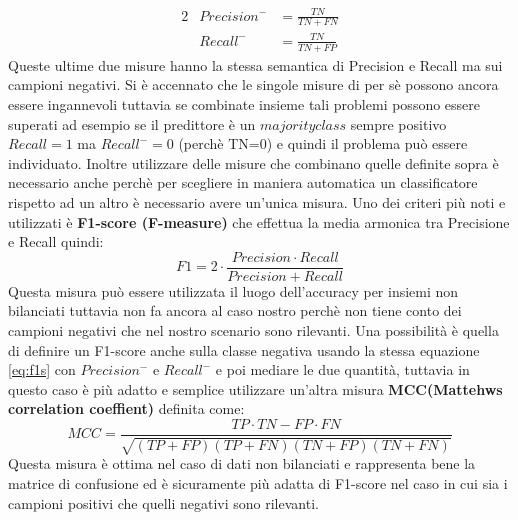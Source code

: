 \begin{alignat*}{2}
& Precision^{-} &= \frac{TN}{TN+FN}\\
& Recall^{-} &=  \frac{TN}{TN+FP}
\end{alignat*} 
Queste ultime due misure hanno la stessa semantica di Precision e Recall ma sui campioni negativi. Si è accennato che le singole misure di per sè possono ancora essere ingannevoli tuttavia se combinate insieme tali problemi possono essere superati ad esempio se il predittore è un $majority class$ sempre positivo $Recall=1$ ma  $Recall^{-}=0$ (perchè TN=0) e quindi il problema può essere individuato. Inoltre utilizzare delle misure che combinano quelle definite sopra è necessario anche perchè per scegliere in maniera automatica un classificatore rispetto ad un altro è necessario avere un'unica misura. Uno dei criteri più noti e utilizzati è \textbf{F1-score (F-measure)} che effettua la media armonica tra Precisione e Recall quindi:
\begin{equation*}
\label{eq:f1s}
F1 = 2 \cdot \frac{Precision \cdot Recall}{Precision + Recall}
\end{equation*}
Questa misura può essere utilizzata il luogo dell'accuracy per insiemi non bilanciati tuttavia non fa ancora al caso nostro perchè non tiene conto dei campioni negativi che nel nostro scenario sono rilevanti. Una possibilità è quella di definire un F1-score anche sulla classe negativa usando la stessa equazione \eqref{eq:f1s} con $Precision^{-}\text{ e } Recall^{-}$ e poi mediare le due quantità, tuttavia in questo caso è più adatto e semplice utilizzare un'altra misura \textbf{MCC(Mattehws correlation coeffient)} definita come:
\begin{equation*}
MCC = \frac{TP \cdot TN−FP \cdot FN}{\sqrt{(TP+FP)(TP+FN)(TN+FP)(TN+FN)}}
 \end{equation*}
 Questa misura è ottima nel caso di dati non bilanciati e rappresenta bene la matrice di confusione ed è sicuramente più adatta di F1-score nel caso in cui sia i campioni positivi che quelli negativi sono rilevanti.
